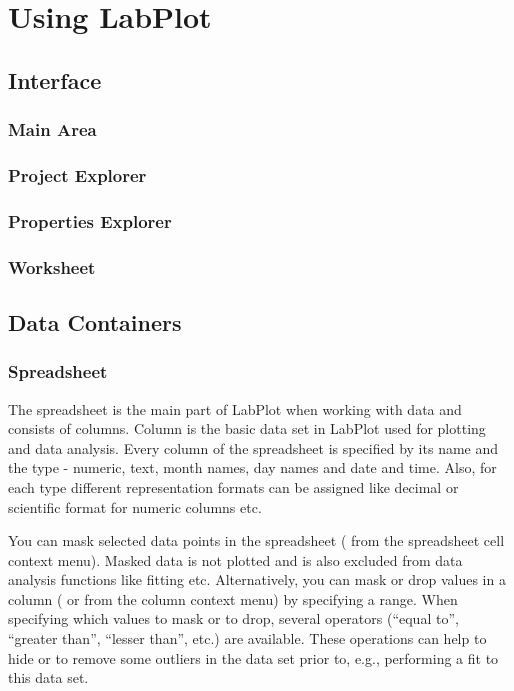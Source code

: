 \part{Using LabPlot}

\chapter{Interface}\label{ch:interface}
\section{Main Area}\label{sec:main_area}
\section{Project Explorer}\label{sec:project_explorer}
\section{Properties Explorer}\label{sec:properties_explorer}
\section{Worksheet}\label{sec:worksheet}

\chapter{Data Containers}\label{ch:data_container}
\section{Spreadsheet}\label{sec:spreadsheet}
The spreadsheet is the main part of LabPlot when working with data and consists of columns.
Column is the basic data set in LabPlot used for plotting and data analysis.
Every column of the spreadsheet is specified by its name and the type - numeric, text, month names, day names and date and time.
Also, for each type different representation formats can be assigned like decimal or scientific format for numeric columns etc.

You can mask selected data points in the spreadsheet ( from the spreadsheet cell context menu).
Masked data is not plotted and is also excluded from data analysis functions like fitting etc.
Alternatively, you can mask or drop values in a column ( or  from the column context menu) by specifying a range.
When specifying which values to mask or to drop, several operators (“equal to”, “greater than”, “lesser than”, etc.) are available.
These operations can help to hide or to remove some outliers in the data set prior to, e.g., performing a fit to this data set.

